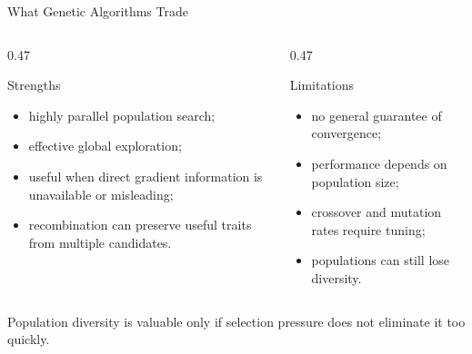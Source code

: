 \documentclass[aspectratio=169,10pt]{beamer}
\begin{document}
\begin{frame}[shrink=20]{What Genetic Algorithms Trade}
  \begin{columns}[T,onlytextwidth]
    \begin{column}{0.47\textwidth}
      \begin{block}{Strengths}
        \begin{itemize}
          \item highly parallel population search;
          \item effective global exploration;
          \item useful when direct gradient information is unavailable or misleading;
          \item recombination can preserve useful traits from multiple candidates.
        \end{itemize}
      \end{block}
    \end{column}

    \begin{column}{0.47\textwidth}
      \begin{block}{Limitations}
        \begin{itemize}
          \item no general guarantee of convergence;
          \item performance depends on population size;
          \item crossover and mutation rates require tuning;
          \item populations can still lose diversity.
        \end{itemize}
      \end{block}
    \end{column}
  \end{columns}

  \begin{keyidea}
    Population diversity is valuable only if selection pressure does not eliminate it too quickly.
  \end{keyidea}
\end{frame}

\end{document}
